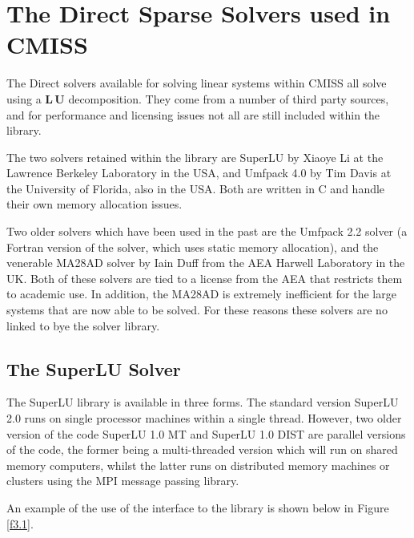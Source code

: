
\section{The Direct Sparse Solvers used in CMISS}\label{s3.0}

The Direct solvers available for solving linear systems within CMISS all
solve using a $\mathbf{L \, U}$ decomposition. They come from a number
of third party sources, and for performance and licensing issues not all 
are still included within the library.

The two solvers retained within the library are SuperLU by Xiaoye Li at
the Lawrence Berkeley Laboratory in the USA, and Umfpack 4.0 by Tim Davis 
at the University of Florida, also in the USA. Both are written in C and 
handle their own memory allocation issues. 

Two older solvers which have been used in the past are the Umfpack 2.2 
solver (a Fortran version of the solver, which uses static memory 
allocation), and the venerable MA28AD solver by Iain Duff from the AEA 
Harwell Laboratory in the UK. 
Both of these solvers are tied to a license from the AEA that restricts 
them to academic use. In addition, the MA28AD is extremely inefficient for 
the large systems that are now able to be solved. For these reasons these
solvers are no linked to bye the solver library.

\subsection{The SuperLU Solver}\label{s3.1}

The SuperLU library is available in three forms. The standard version 
SuperLU 2.0 runs on single processor machines within a single thread. 
However, two older version of the code SuperLU 1.0 MT and SuperLU 1.0 DIST
are parallel versions of the code, the former being a multi-threaded version 
which will run on shared memory computers, whilst the latter runs on
distributed memory machines or clusters using the MPI message passing library.

An example of the use of the interface to the library is shown below in 
Figure \ref{f3.1}.

